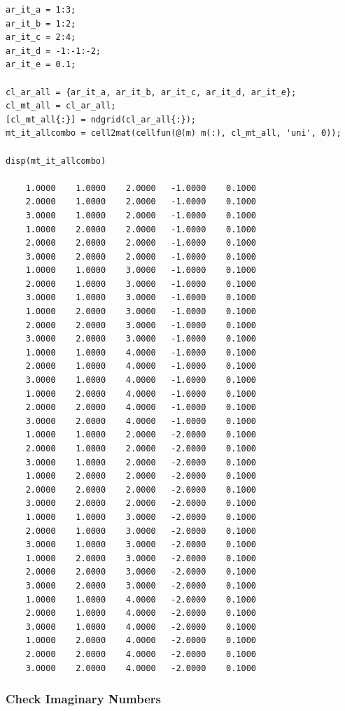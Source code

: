 \documentclass[
]{book}
\begin{document}
\begin{verbatim}
ar_it_a = 1:3;
ar_it_b = 1:2;
ar_it_c = 2:4;
ar_it_d = -1:-1:-2;
ar_it_e = 0.1;

cl_ar_all = {ar_it_a, ar_it_b, ar_it_c, ar_it_d, ar_it_e};
cl_mt_all = cl_ar_all;
[cl_mt_all{:}] = ndgrid(cl_ar_all{:});
mt_it_allcombo = cell2mat(cellfun(@(m) m(:), cl_mt_all, 'uni', 0));

disp(mt_it_allcombo)

    1.0000    1.0000    2.0000   -1.0000    0.1000
    2.0000    1.0000    2.0000   -1.0000    0.1000
    3.0000    1.0000    2.0000   -1.0000    0.1000
    1.0000    2.0000    2.0000   -1.0000    0.1000
    2.0000    2.0000    2.0000   -1.0000    0.1000
    3.0000    2.0000    2.0000   -1.0000    0.1000
    1.0000    1.0000    3.0000   -1.0000    0.1000
    2.0000    1.0000    3.0000   -1.0000    0.1000
    3.0000    1.0000    3.0000   -1.0000    0.1000
    1.0000    2.0000    3.0000   -1.0000    0.1000
    2.0000    2.0000    3.0000   -1.0000    0.1000
    3.0000    2.0000    3.0000   -1.0000    0.1000
    1.0000    1.0000    4.0000   -1.0000    0.1000
    2.0000    1.0000    4.0000   -1.0000    0.1000
    3.0000    1.0000    4.0000   -1.0000    0.1000
    1.0000    2.0000    4.0000   -1.0000    0.1000
    2.0000    2.0000    4.0000   -1.0000    0.1000
    3.0000    2.0000    4.0000   -1.0000    0.1000
    1.0000    1.0000    2.0000   -2.0000    0.1000
    2.0000    1.0000    2.0000   -2.0000    0.1000
    3.0000    1.0000    2.0000   -2.0000    0.1000
    1.0000    2.0000    2.0000   -2.0000    0.1000
    2.0000    2.0000    2.0000   -2.0000    0.1000
    3.0000    2.0000    2.0000   -2.0000    0.1000
    1.0000    1.0000    3.0000   -2.0000    0.1000
    2.0000    1.0000    3.0000   -2.0000    0.1000
    3.0000    1.0000    3.0000   -2.0000    0.1000
    1.0000    2.0000    3.0000   -2.0000    0.1000
    2.0000    2.0000    3.0000   -2.0000    0.1000
    3.0000    2.0000    3.0000   -2.0000    0.1000
    1.0000    1.0000    4.0000   -2.0000    0.1000
    2.0000    1.0000    4.0000   -2.0000    0.1000
    3.0000    1.0000    4.0000   -2.0000    0.1000
    1.0000    2.0000    4.0000   -2.0000    0.1000
    2.0000    2.0000    4.0000   -2.0000    0.1000
    3.0000    2.0000    4.0000   -2.0000    0.1000
\end{verbatim}

\hypertarget{check-imaginary-numbers}{%
\subsubsection{Check Imaginary Numbers}\label{check-imaginary-numbers}}
\end{document}
